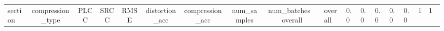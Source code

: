 \begin{tabular}{lcccccccc}
\hline
section & compression\_type & PLCC & SRCC & RMSE & distortion\_acc & compression\_acc & num\_samples & num\_batches \
\hline
overall & overall & 0.0 & 0.0 & 0.0 & 0.0 & 0.0 & 1 & 1 \
\hline
\end{tabular}
